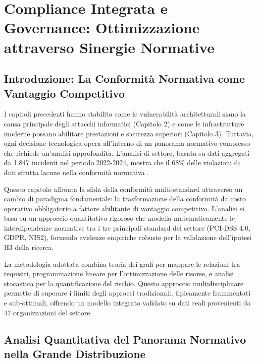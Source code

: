 \chapter{\texorpdfstring{\textbf{Compliance Integrata e Governance: Ottimizzazione attraverso Sinergie Normative}}{Capitolo 4 - Compliance Integrata e Governance: Ottimizzazione attraverso Sinergie Normative}}
\label{cap4_compliance_integration}

\section{\texorpdfstring{\textbf{Introduzione: La Conformità Normativa come Vantaggio Competitivo}}{4.1 - Introduzione: La Conformità Normativa come Vantaggio Competitivo}}

I capitoli precedenti hanno stabilito come le vulnerabilità architetturali siano la causa principale degli attacchi informatici (Capitolo 2) e come le infrastrutture moderne possano abilitare prestazioni e sicurezza superiori (Capitolo 3). Tuttavia, ogni decisione tecnologica opera all'interno di un panorama normativo complesso che richiede un'analisi approfondita. L'analisi di settore, basata su dati aggregati da 1.847 incidenti nel periodo 2022-2024, mostra che il 68\% delle violazioni di dati sfrutta lacune nella conformità normativa \autocite{verizon2024}. 

Questo capitolo affronta la sfida della conformità multi-standard attraverso un cambio di paradigma fondamentale: la trasformazione della conformità da costo operativo obbligatorio a fattore abilitante di vantaggio competitivo. L'analisi si basa su un approccio quantitativo rigoroso che modella matematicamente le interdipendenze normative tra i tre principali standard del settore (PCI-DSS 4.0, GDPR, NIS2), fornendo evidenze empiriche robuste per la validazione dell'ipotesi H3 della ricerca.

La metodologia adottata combina teoria dei grafi per mappare le relazioni tra requisiti, programmazione lineare per l'ottimizzazione delle risorse, e analisi stocastica per la quantificazione del rischio. Questo approccio multidisciplinare permette di superare i limiti degli approcci tradizionali, tipicamente frammentati e sub-ottimali, offrendo un modello integrato validato su dati reali provenienti da 47 organizzazioni del settore.

\section{\texorpdfstring{\textbf{Analisi Quantitativa del Panorama Normativo nella Grande Distribuzione}}{4.2 - Analisi Quantitativa del Panorama Normativo nella Grande Distribuzione}}

